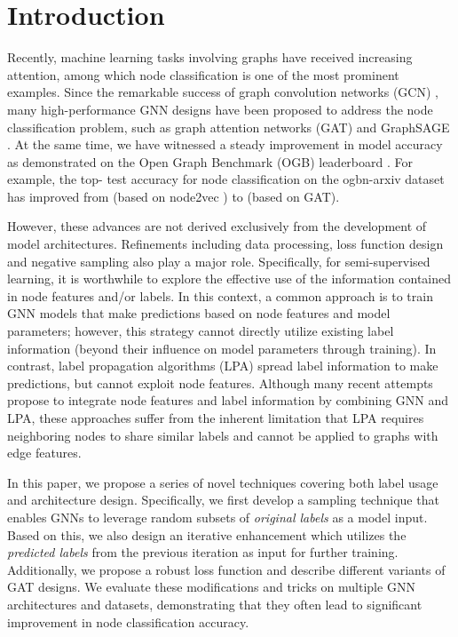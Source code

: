 \documentclass[sigconf,screen,nonacm]{acmart} \usepackage{booktabs}
\begin{document}
	\section{Introduction}
	Recently, machine learning tasks involving graphs have received increasing attention, among which node classification is one of the most prominent examples.
	Since the remarkable success of graph convolution networks (GCN) \citep{kipf2016semi}, many high-performance GNN designs have been proposed to address the node classification problem, such as graph attention networks (GAT) \citep{velivckovic2017graph} and GraphSAGE \citep{hamilton2017inductive}.
	At the same time, we have witnessed a steady improvement in model accuracy as demonstrated on the Open Graph Benchmark (OGB) leaderboard \citep{hu2020open}.
	For example, the top- test accuracy for node classification on the ogbn-arxiv dataset has improved from  (based on node2vec \citep{grover2016node2vec}) to  (based on GAT).
	
	However, these advances are not derived exclusively from the development of model architectures.
	Refinements including data processing, loss function design and negative sampling also play a major role.
	Specifically, for semi-supervised learning, it is worthwhile to explore the effective use of the information contained in node features and/or labels.
	In this context, a common approach is to train GNN models that make predictions based on node features and model parameters; however, this strategy cannot directly utilize existing label information (beyond their influence on model parameters through training). 
	In contrast, label propagation algorithms (LPA) \citep{zhu2005semi} spread label information to make predictions, but cannot exploit node features.
Although many recent attempts \citep{klicpera2018predict,huang2020combining} propose to integrate node features and label information by combining GNN and LPA, these approaches suffer from the inherent limitation that LPA requires neighboring nodes to share similar labels and cannot be applied to graphs with edge features.
	
	In this paper, we propose a series of novel techniques covering both label usage and architecture design.
    Specifically, we first develop a sampling technique that enables GNNs to leverage random subsets of \emph{original labels} as a model input.
    Based on this, we also design an iterative enhancement which utilizes the \emph{predicted labels} from the previous iteration as input for further training.
    Additionally, we propose a robust loss function and describe different variants of GAT designs.
	We evaluate these modifications and tricks on multiple GNN architectures and datasets, demonstrating that they often lead to significant improvement in node classification accuracy.  
	
\end{document}
